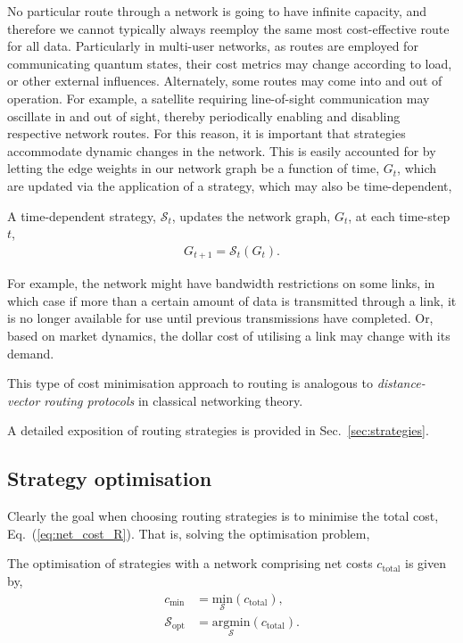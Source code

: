 No particular route through a network is going to have infinite capacity, and therefore we cannot typically always reemploy the same most cost-effective route for all data. Particularly in multi-user networks, as routes are employed for communicating quantum states, their cost metrics may change according to load, or other external influences. Alternately, some routes may come into and out of operation. For example, a satellite requiring line-of-sight communication may oscillate in and out of sight, thereby periodically enabling and disabling respective network routes. For this reason, it is important that strategies accommodate dynamic changes in the network. This is easily accounted for by letting the edge weights in our network graph be a function of time, $G_t$, which are updated via the application of a strategy, which may also be time-dependent,
\begin{definition}
A time-dependent strategy, $\mathcal{S}_t$, updates the network graph, $G_t$, at each time-step $t$,
\begin{align} \label{eq:S_G}
G_{t+1} = \mathcal{S}_t(G_t).
\end{align}
\end{definition}
For example, the network might have bandwidth restrictions on some links, in which case if more than a certain amount of data is transmitted through a link, it is no longer available for use until previous transmissions have completed. Or, based on market dynamics, the dollar cost of utilising a link may change with its demand.

This type of cost minimisation approach to routing is analogous to \textit{distance-vector routing protocols} in classical networking theory.

A detailed exposition of routing strategies is provided in Sec.~\ref{sec:strategies}.

%
%

\subsection{Strategy optimisation} \label{sec:strat_opt}  

Clearly the goal when choosing routing strategies is to minimise the total cost, Eq.~(\ref{eq:net_cost_R}). That is, solving the optimisation problem,
\begin{definition}
The optimisation of strategies with a network comprising net costs $c_\text{total}$ is given by,
\begin{align}
c_\text{min} &= \underset{\mathcal{S}}{\text{min}}(c_\text{total}), \nonumber \\
\mathcal{S}_\text{opt} &= \underset{\mathcal{S}}{\text{argmin}} (c_\text{total}).
\end{align}
\end{definition}

